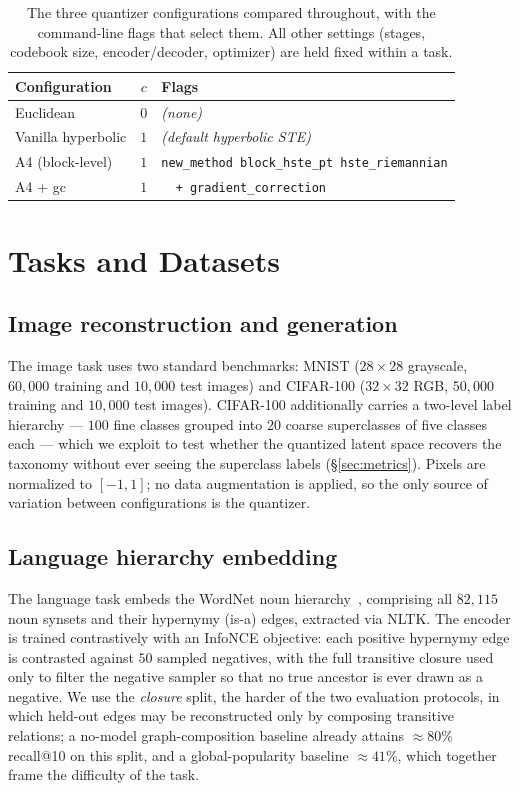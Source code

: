 \documentclass[12pt]{report}
\begin{document}
\begin{table}[h]
\centering
\caption{The three quantizer configurations compared throughout, with the command-line flags that select them. All other settings (stages, codebook size, encoder/decoder, optimizer) are held fixed within a task.}
\label{tab:configs}
\begin{tabular}{lcl}
\hline
Configuration & $c$ & Flags \\
\hline
Euclidean & $0$ & \emph{(none)} \\
Vanilla hyperbolic & $1$ & \emph{(default hyperbolic STE)} \\
A4 (block-level) & $1$ & \texttt{new\_method block\_hste\_pt hste\_riemannian} \\
A4 + gc & $1$ & \texttt{\ \ + gradient\_correction} \\
\hline
\end{tabular}
\end{table}

\section{Tasks and Datasets}
\label{sec:tasks}

\subsection{Image reconstruction and generation}
\label{sec:tasks_image}
The image task uses two standard benchmarks: MNIST ($28\times28$ grayscale, $60{,}000$ training and $10{,}000$ test images) and CIFAR-100 ($32\times32$ RGB, $50{,}000$ training and $10{,}000$ test images). CIFAR-100 additionally carries a two-level label hierarchy --- $100$ fine classes grouped into $20$ coarse superclasses of five classes each --- which we exploit to test whether the quantized latent space recovers the taxonomy without ever seeing the superclass labels (\S\ref{sec:metrics}). Pixels are normalized to $[-1,1]$; no data augmentation is applied, so the only source of variation between configurations is the quantizer.

\subsection{Language hierarchy embedding}
\label{sec:tasks_nlp}
The language task embeds the WordNet noun hierarchy~\cite{nickel2017poincare}, comprising all $82{,}115$ noun synsets and their hypernymy (is-a) edges, extracted via NLTK. The encoder is trained contrastively with an InfoNCE objective: each positive hypernymy edge is contrasted against $50$ sampled negatives, with the full transitive closure used only to filter the negative sampler so that no true ancestor is ever drawn as a negative. We use the \emph{closure} split, the harder of the two evaluation protocols, in which held-out edges may be reconstructed only by composing transitive relations; a no-model graph-composition baseline already attains $\approx 80\%$ recall@10 on this split, and a global-popularity baseline $\approx 41\%$, which together frame the difficulty of the task.
\end{document}
